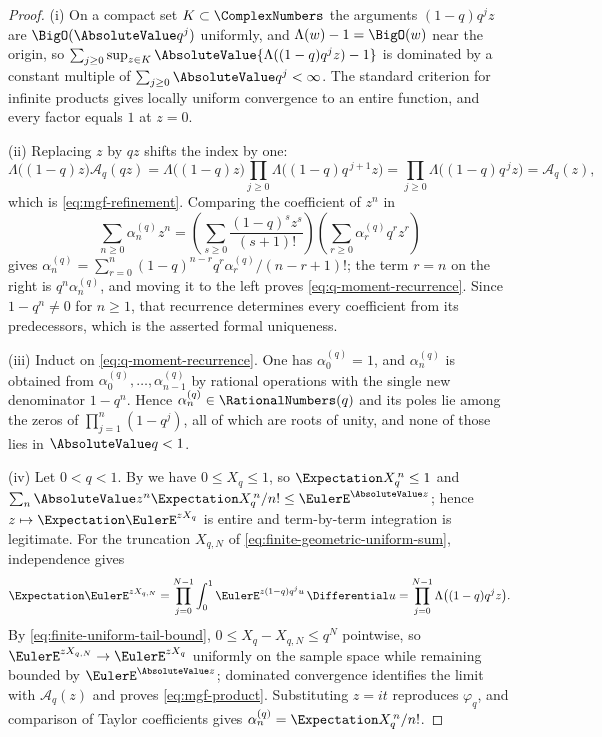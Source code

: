 \documentclass[11pt,a4paper,oneside,openany]{book}
\theoremstyle{definition}
\theoremstyle{remark}
\begin{document}
\begin{proof}
(i)  On a compact set $K\subset\ComplexNumbers$ the arguments $(1-q)q^jz$ are $\BigO(\AbsoluteValue q^j)$ uniformly,
and $\Lambda(w)-1=\BigO(w)$ near the origin, so
$\sum_{j\ge0}\sup_{z\in K}\AbsoluteValue{\Lambda((1-q)q^jz)-1}$ is dominated by a constant multiple of
$\sum_{j\ge0}\AbsoluteValue q^j<\infty$.  The standard criterion for infinite products gives locally
uniform convergence to an entire function, and every factor equals $1$ at $z=0$.

(ii)  Replacing $z$ by $qz$ shifts the index by one:
\[
 \Lambda\bigl((1-q)z\bigr)\mathcal A_q(qz)
 =\Lambda\bigl((1-q)z\bigr)\prod_{j\ge0}\Lambda\bigl((1-q)q^{\,j+1}z\bigr)
 =\prod_{j\ge0}\Lambda\bigl((1-q)q^{\,j}z\bigr)
 =\mathcal A_q(z),
\]
which is \eqref{eq:mgf-refinement}.  Comparing the coefficient of $z^n$ in
\[
 \sum_{n\ge0}\alpha^{(q)}_nz^n
 =\left(\sum_{s\ge0}\frac{(1-q)^sz^s}{(s+1)!}\right)
  \left(\sum_{r\ge0}\alpha^{(q)}_rq^rz^r\right)
\]
gives $\alpha^{(q)}_n=\sum_{r=0}^{n}(1-q)^{n-r}q^r\alpha^{(q)}_r/(n-r+1)!$; the term $r=n$ on
the right is $q^n\alpha^{(q)}_n$, and moving it to the left proves
\eqref{eq:q-moment-recurrence}.  Since $1-q^n\ne0$ for $n\ge1$, that recurrence determines
every coefficient from its predecessors, which is the asserted formal uniqueness.

(iii)  Induct on \eqref{eq:q-moment-recurrence}.  One has $\alpha^{(q)}_0=1$, and
$\alpha^{(q)}_n$ is obtained from $\alpha^{(q)}_0,\ldots,\alpha^{(q)}_{n-1}$ by rational
operations with the single new denominator $1-q^n$.  Hence $\alpha^{(q)}_n\in\RationalNumbers(q)$ and its
poles lie among the zeros of $\prod_{j=1}^{n}(1-q^j)$, all of which are roots of unity, and
none of those lies in $\AbsoluteValue q<1$.

(iv)  Let $0<q<1$.  By  we have $0\le X_q\le1$, so
$\Expectation X_q^{\,n}\le1$ and $\sum_n\AbsoluteValue z^n\Expectation X_q^{\,n}/n!\le\EulerE^{\AbsoluteValue z}$; hence
$z\mapsto\Expectation\EulerE^{zX_q}$ is entire and term-by-term integration is legitimate.  For the
truncation $X_{q,N}$ of \eqref{eq:finite-geometric-uniform-sum}, independence gives
\[
 \Expectation\EulerE^{zX_{q,N}}
 =\prod_{j=0}^{N-1}\int_0^1\EulerE^{z(1-q)q^ju}\,\Differential u
 =\prod_{j=0}^{N-1}\Lambda\bigl((1-q)q^jz\bigr).
\]
By \eqref{eq:finite-uniform-tail-bound}, $0\le X_q-X_{q,N}\le q^N$ pointwise, so
$\EulerE^{zX_{q,N}}\to\EulerE^{zX_q}$ uniformly on the sample space while remaining bounded by
$\EulerE^{\AbsoluteValue z}$; dominated convergence identifies the limit with $\mathcal A_q(z)$ and proves
\eqref{eq:mgf-product}.  Substituting $z=it$ reproduces $\varphi_q$, and comparison of Taylor
coefficients gives $\alpha^{(q)}_n=\Expectation X_q^{\,n}/n!$.
\end{proof}
\end{document}
